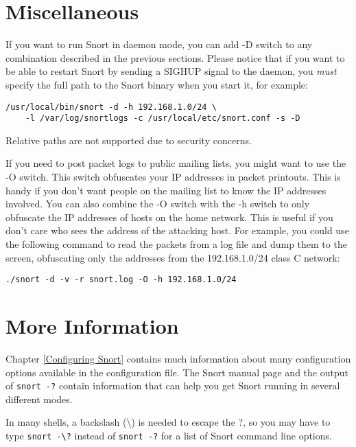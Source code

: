 \documentclass[english]{report}
\newenvironment{note}{
\samepage
    \vspace{10pt}{\textsf{
        {\hspace{7pt}\Huge{$\triangle$\hspace{-12.5pt}{\Large{$^!$}}}}\hspace{5pt}
        {\Large{NOTE}}
    }
    }
   \begin{center}
    \par\vspace{-17pt}

    \begin{lrbox}{\savepar}
    \begin{minipage}[r]{6in}
}
{
    \end{minipage}
    \end{lrbox}
    \fbox{
        \usebox{
            \savepar
        }
    }
    \par\vskip10pt
    \end{center}
}
\begin{document}
\section{Miscellaneous}

If you want to run Snort in daemon mode, you can add -D switch to any
combination described in the previous sections. Please notice that if you want to be able to restart Snort
by sending a SIGHUP signal to the daemon, you {\em must} specify the full path to the Snort
binary when you start it, for example:

\begin{center}
\begin{verbatim}
/usr/local/bin/snort -d -h 192.168.1.0/24 \
    -l /var/log/snortlogs -c /usr/local/etc/snort.conf -s -D
\end{verbatim}
\end{center}

Relative paths are not supported due to security concerns.

If you need to post packet logs to public mailing lists, you might
want to use the -O switch. This switch obfuscates your IP addresses in
packet printouts. This is handy if you don't want people on the mailing
list to know the IP addresses involved. You can also combine the -O switch with
the -h switch to only obfuscate the IP addresses of hosts on the home network.
This is useful if you don't care who sees the address of the attacking host.
For example, you could use the following command to read the packets from a log 
file and dump them to the screen, obfuscating only the addresses from the 
192.168.1.0/24 class C network:

\begin{center}
\begin{verbatim}
./snort -d -v -r snort.log -O -h 192.168.1.0/24
\end{verbatim}
\end{center}


\section{More Information}

Chapter \ref{Configuring Snort} contains much information about many
configuration options available in the configuration file.  The Snort manual
page and the output of \texttt{snort -?} contain information that can help 
you get Snort running in several different modes.

\begin{note}
In many shells, a backslash (\textbackslash{}) is needed to escape the ?, so you may have to type 
\texttt{snort -\textbackslash{}?} instead of \texttt{snort -?} for a list of Snort command line options.
\end{note}
\end{document}
